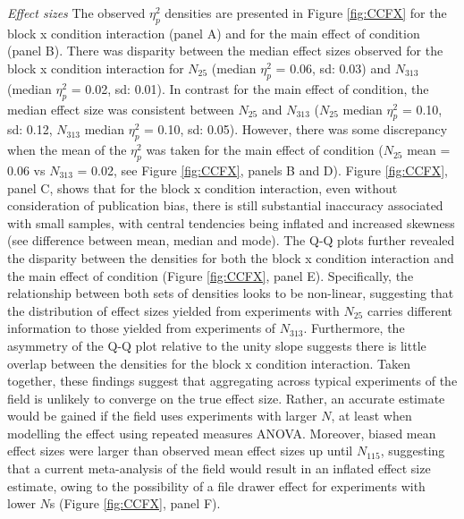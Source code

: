 \documentclass{article}
\begin{document}
\emph{Effect sizes} The observed \(\eta_{p}^2\) densities are presented in Figure \ref{fig:CCFX} for the block x condition interaction (panel A) and for the main effect of condition (panel B). There was disparity between the median effect sizes observed for the block x condition interaction for \(N_{25}\) (median \(\eta_{p}^2\) = 0.06, sd: 0.03) and \(N_{313}\) (median \(\eta_{p}^2\) = 0.02, sd: 0.01). In contrast for the main effect of condition, the median effect size was consistent between \(N_{25}\) and \(N_{313}\) (\(N_{25}\) median \(\eta_{p}^2\) = 0.10, sd: 0.12, \(N_{313}\) median \(\eta_{p}^2\) = 0.10, sd: 0.05). However, there was some discrepancy when the mean of the \(\eta_{p}^2\) was taken for the main effect of condition (\(N_{25}\) mean = 0.06 vs \(N_{313}\) = 0.02, see Figure \ref{fig:CCFX}, panels B and D). Figure \ref{fig:CCFX}, panel C, shows that for the block x condition interaction, even without consideration of publication bias, there is still substantial inaccuracy associated with small samples, with central tendencies being inflated and increased skewness (see difference between mean, median and mode). The Q-Q plots further revealed the disparity between the densities for both the block x condition interaction and the main effect of condition (Figure \ref{fig:CCFX}, panel E). Specifically, the relationship between both sets of densities looks to be non-linear, suggesting that the distribution of effect sizes yielded from experiments with \(N_{25}\) carries different information to those yielded from experiments of \(N_{313}\). Furthermore, the asymmetry of the Q-Q plot relative to the unity slope suggests there is little overlap between the densities for the block x condition interaction. Taken together, these findings suggest that aggregating across typical experiments of the field is unlikely to converge on the true effect size. Rather, an accurate estimate would be gained if the field uses experiments with larger \(N\), at least when modelling the effect using repeated measures ANOVA. Moreover, biased mean effect sizes were larger than observed mean effect sizes up until \(N_{115}\), suggesting that a current meta-analysis of the field would result in an inflated effect size estimate, owing to the possibility of a file drawer effect for experiments with lower \(N\)s (Figure \ref{fig:CCFX}, panel F).
\end{document}
